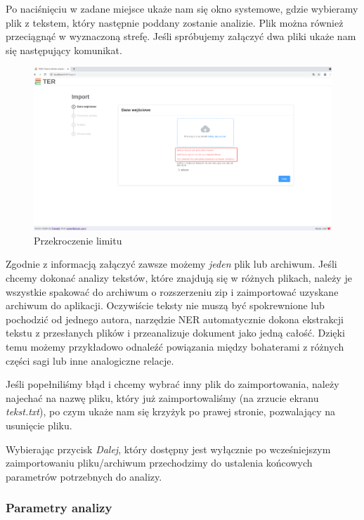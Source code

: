 \documentclass[12pt, a4paper]{article}
\begin{document}
Po naciśnięciu w zadane miejsce ukaże nam się okno systemowe, gdzie wybieramy plik z tekstem, który następnie poddany zostanie analizie. Plik można również przeciągnąć w wyznaczoną strefę. Jeśli spróbujemy załączyć dwa pliki ukaże nam się następujący komunikat.

\begin{figure}[H]
    \centering
    \includegraphics[width=\linewidth]{images/import-error.png}
    \caption{Przekroczenie limitu}
\end{figure}

Zgodnie z informacją załączyć zawsze możemy \textit{jeden} plik lub archiwum. Jeśli chcemy dokonać analizy tekstów, które znajdują się w różnych plikach, należy je wszystkie spakować do archiwum o rozszerzeniu zip i zaimportować uzyskane archiwum do aplikacji. Oczywiście teksty nie muszą być spokrewnione lub pochodzić od jednego autora, narzędzie NER automatycznie dokona ekstrakcji tekstu z przesłanych plików i przeanalizuje dokument jako jedną całość. Dzięki temu możemy przykładowo odnaleźć powiązania między bohaterami z różnych części sagi lub inne analogiczne relacje.

Jeśli popełniliśmy błąd i chcemy wybrać inny plik do zaimportowania, należy najechać na nazwę pliku, który już zaimportowaliśmy (na zrzucie ekranu \textit{tekst.txt}), po czym ukaże nam się krzyżyk po prawej stronie, pozwalający na usunięcie pliku.

Wybierając przycisk \textit{Dalej}, który dostępny jest wyłącznie po wcześniejszym zaimportowaniu pliku/archiwum przechodzimy do ustalenia końcowych parametrów potrzebnych do analizy.

\subsubsection{Parametry analizy}
\end{document}
